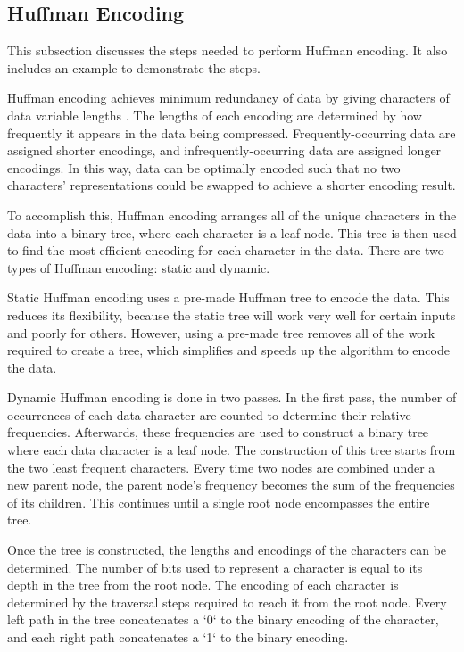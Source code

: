\documentclass[doublespace,nopageskip]{VTthesis}
\begin{document}

\subsection{Huffman Encoding}\label{ss:huffman_encoding}
This subsection discusses the steps needed to perform Huffman encoding. It also includes an example to demonstrate the steps.

Huffman encoding achieves minimum redundancy of data by giving characters of data variable lengths \cite{huffman}. The lengths of each encoding are determined by how frequently it appears in the data being compressed. Frequently-occurring data are assigned shorter encodings, and infrequently-occurring data are assigned longer encodings. In this way, data can be optimally encoded such that no two characters' representations could be swapped to achieve a shorter encoding result. 

To accomplish this, Huffman encoding arranges all of the unique characters in the data into a binary tree, where each character is a leaf node. This tree is then used to find the most efficient encoding for each character in the data. There are two types of Huffman encoding: static and dynamic.

Static Huffman encoding uses a pre-made Huffman tree to encode the data. This reduces its flexibility, because the static tree will work very well for certain inputs and poorly for others. However, using a pre-made tree removes all of the work required to create a tree, which simplifies and speeds up the algorithm to encode the data.

Dynamic Huffman encoding is done in two passes. In the first pass, the number of occurrences of each data character are counted to determine their relative frequencies. Afterwards, these frequencies are used to construct a binary tree where each data character is a leaf node. The construction of this tree starts from the two least frequent characters. Every time two nodes are combined under a new parent node, the parent node's frequency becomes the sum of the frequencies of its children. This continues until a single root node encompasses the entire tree.

Once the tree is constructed, the lengths and encodings of the characters can be determined. The number of bits used to represent a character is equal to its depth in the tree from the root node. The encoding of each character is determined by the traversal steps required to reach it from the root node. Every left path in the tree concatenates a `0` to the binary encoding of the character, and each right path concatenates a `1` to the binary encoding.
\end{document}
